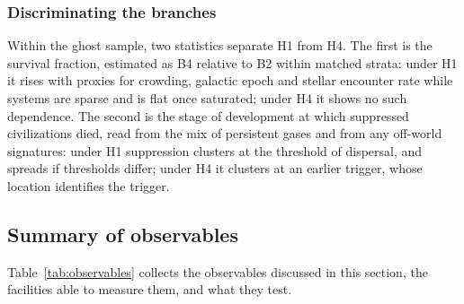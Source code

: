 \documentclass[preprint,12pt]{elsarticle}
\theoremstyle{definition}
\begin{document}
\subsubsection{Discriminating the branches}

Within the ghost sample, two statistics separate H1 from H4. The first is the survival fraction, estimated as B4 relative to B2 within matched strata: under H1 it rises with proxies for crowding, galactic epoch and stellar encounter rate while systems are sparse and is flat once saturated; under H4 it shows no such dependence. The second is the stage of development at which suppressed civilizations died, read from the mix of persistent gases and from any off-world signatures: under H1 suppression clusters at the threshold of dispersal, and spreads if thresholds differ; under H4 it clusters at an earlier trigger, whose location identifies the trigger.

\subsection{Summary of observables}

Table~\ref{tab:observables} collects the observables discussed in this section, the facilities able to measure them, and what they test.
\end{document}
